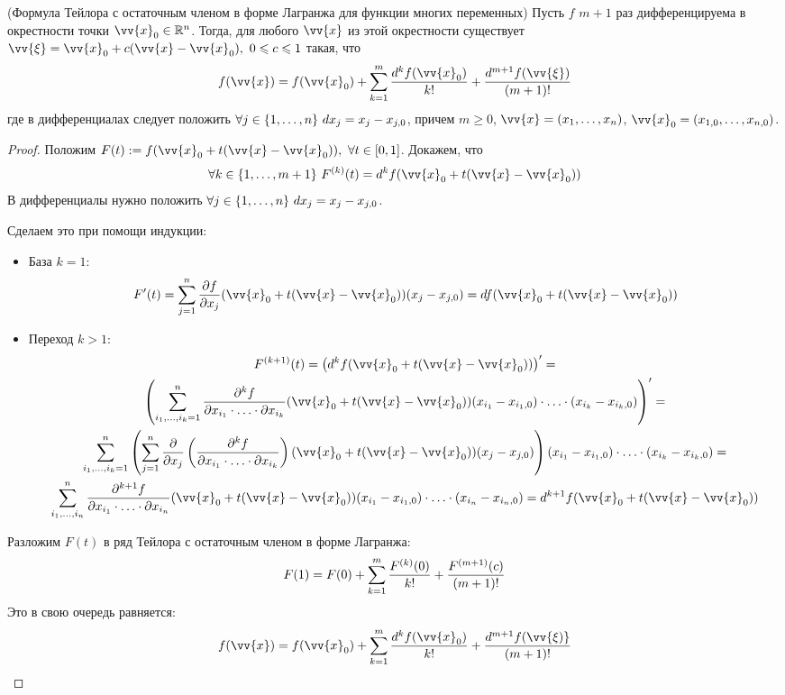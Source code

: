 \begin{theorem} (Формула Тейлора с остаточным членом в форме Лагранжа для функции многих переменных)
	Пусть $f$ $m + 1$ раз дифференцируема в окрестности точки $\vv{x}_0 \in \R^n$. Тогда, для любого $\vv{x}$ из этой окрестности существует $\vv{\xi} = \vv{x}_0 + c(\vv{x} - \vv{x}_0),\ 0 \le c \le 1$ такая, что
	\[
		f(\vv{x}) = f(\vv{x}_0) + \suml_{k = 1}^m \frac{d^k f(\vv{x}_0)}{k!} + \frac{d^{m + 1} f(\vv{\xi})}{(m + 1)!}
	\]
	где в дифференциалах следует положить $\forall j \in \{1, \ldots, n\}\ dx_j = x_j - x_{j, 0}$, причем $m \geq 0$, $\vv{x} = (x_1, \ldots, x_n)$, $\vv{x}_0 = (x_{1, 0}, \ldots, x_{n, 0})$.
\end{theorem}

\begin{proof}
	Положим $F(t) := f(\vv{x}_0 + t(\vv{x} - \vv{x}_0)),\  \forall t \in [0, 1]$. Докажем, что
	\[
		\forall k \in \range{m + 1}\ F^{(k)} (t) = d^k f(\vv{x}_0 + t(\vv{x} - \vv{x}_0))
	\]
	В дифференциалы нужно положить $\forall j \in \{1, \ldots, n\} \ dx_j = x_j - x_{j, 0}$.
	
	Сделаем это при помощи индукции:
	\begin{itemize}
		\item База $k = 1$:
		\[
			F'(t) = \suml_{j = 1}^n \pd{f}{x_j} (\vv{x}_0 + t(\vv{x} - \vv{x}_0)) (x_j - x_{j, 0}) = df (\vv{x}_0 + t(\vv{x} - \vv{x}_0))
		\]
		\item Переход $k > 1$:
		\begin{multline*}
			F^{(k + 1)}(t) = \left(d^k f(\vv{x}_0 + t(\vv{x} - \vv{x}_0))\right)' =
			\\
			\left(\suml_{i_1, \ldots, i_k  = 1}^n \frac{\vdelta^k f}{\vdelta x_{i_1} \cdot \ldots \cdot \vdelta x_{i_k}} (\vv{x}_0 + t(\vv{x} - \vv{x}_0)) (x_{i_1} - x_{i_1, 0}) \cdot \ldots \cdot (x_{i_k} - x_{i_k, 0})\right)' =
			\\
			\suml_{i_1, \ldots, i_k = 1}^n \left(\suml_{j = 1}^n \pd{}{x_j} \left(\frac{\vdelta^k f}{\vdelta x_{i_1} \cdot \ldots \cdot \vdelta{x_{i_k}}}\right) (\vv{x}_0 + t(\vv{x} - \vv{x}_0))(x_j - x_{j, 0})\right) (x_{i_1} - x_{i_1, 0}) \cdot \ldots \cdot (x_{i_k} - x_{i_k, 0}) = 
			\\
			\suml_{i_1, \ldots, i_n}^n\frac{\vdelta^{k + 1} f}{\vdelta x_{i_1}\cdot\ldots\cdot \vdelta x_{i_n}}(\vv{x}_0 + t(\vv{x} - \vv{x}_0))(x_{i_1} - x_{i_1, 0})\cdot\ldots\cdot(x_{i_n} - x_{i_n, 0}) = d^{k + 1}f(\vv{x}_0 + t(\vv{x} - \vv{x}_0))
		\end{multline*}
	\end{itemize}
	Разложим $F(t)$ в ряд Тейлора с остаточным членом в форме Лагранжа:
	\[
		F(1) = F(0) + \sum\limits_{k = 1}^m\frac{F^{(k)}(0)}{k!} + \frac{F^{(m + 1)}(c)}{(m + 1)!}
	\]
	Это в свою очередь равняется:
	\[
		f(\vv{x}) = f(\vv{x}_0) + \suml_{k = 1}^m\frac{d^{k}f(\vv{x}_0)}{k!} + \frac{d^{m + 1}f(\vv{\xi)}}{(m + 1)!}
	\]
\end{proof}

